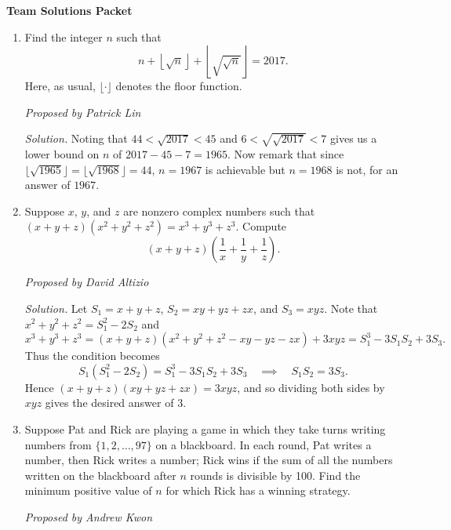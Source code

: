 \documentclass[10pt]{article}
\newcommand{\proposed}[1]
{
\vspace{5pt}
\noindent\textit{Proposed by #1}
}
\newcommand{\solution}
{
\vspace{5pt}
\noindent\textit{Solution.}\qquad
}
\begin{document}
\begin{center}
\huge\textbf{Team Solutions Packet}\normalsize

\vspace{3pt}
\end{center}

\begin{enumerate}

\item Find the integer $n$ such that
\[n + \left\lfloor\sqrt{n}\right\rfloor + \left\lfloor\sqrt{\sqrt{n}}\right\rfloor = 2017.\] Here, as usual, $\lfloor\cdot\rfloor$ denotes the floor function.

\proposed{Patrick Lin}

\solution Noting that $44 < \sqrt{2017} < 45$ and $6 < \sqrt{\sqrt{2017}} < 7$ gives us a lower bound on $n$ of $2017 - 45 - 7 = 1965$.  Now remark that since $\lfloor\sqrt{1965}\rfloor = \lfloor\sqrt{1968}\rfloor = 44$, $n=1967$ is achievable but $n=1968$ is not, for an answer of $\boxed{1967}$.

\item Suppose $x$, $y$, and $z$ are nonzero complex numbers such that $(x+y+z)(x^2+y^2+z^2)=x^3+y^3+z^3$.  Compute \[(x+y+z)\left(\dfrac1x+\dfrac1y+\dfrac1z\right).\]

\proposed{David Altizio}

\solution Let $S_1 = x+y+z$, $S_2 = xy+yz+zx$, and $S_3 = xyz$.  Note that $x^2+y^2+z^2 = S_1^2-2S_2$ and \[x^3+y^3+z^3 = (x+y+z)(x^2+y^2+z^2-xy-yz-zx) + 3xyz = S_1^3-3S_1S_2 + 3S_3.\] Thus the condition becomes \[S_1(S_1^2-2S_2) = S_1^3 - 3S_1S_2 + 3S_3\quad\implies\quad S_1S_2 = 3S_3.\] Hence $(x+y+z)(xy+yz+zx) = 3xyz$, and so dividing both sides by $xyz$ gives the desired answer of $\boxed 3$.

\item Suppose Pat and Rick are playing a game in which they take turns writing numbers from $\{1, 2, \dots, 97\}$ on a blackboard. In each round, Pat writes a number, then Rick writes a number; Rick wins if the sum of all the numbers written on the blackboard after $n$ rounds is divisible by 100. Find the minimum positive value of $n$ for which Rick has a winning strategy.

\proposed{Andrew Kwon}


\end{enumerate}
\end{document}
